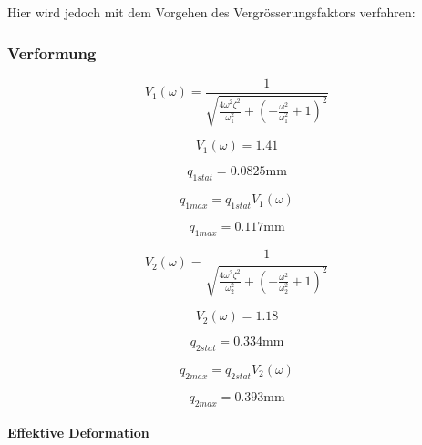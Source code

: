 \documentclass[
  letterpaper,
  DIV=11]{scrreprt}
\let\oldparagraph\paragraph
\renewcommand{\paragraph}[1]{\oldparagraph{#1}\mbox{}}
\begin{document}
Hier wird jedoch mit dem Vorgehen des Vergrösserungsfaktors verfahren:

\hypertarget{verformung}{%
\subsubsection{Verformung}\label{verformung}}

\begin{equation}V_{1}{\left(\omega \right)} = \frac{1}{\sqrt{\frac{4 \omega^{2} \zeta_{}^{2}}{\omega_{1}^{2}} + \left(- \frac{\omega^{2}}{\omega_{1}^{2}} + 1\right)^{2}}}\end{equation}

\begin{equation}V_{1}{\left(\omega \right)} = 1.41\end{equation}

\begin{equation}q_{1 stat} = 0.0825 \text{mm}\end{equation}

\begin{equation}q_{1 max} = q_{1 stat} V_{1}{\left(\omega \right)}\end{equation}

\begin{equation}q_{1 max} = 0.117 \text{mm}\end{equation}

\begin{equation}V_{2}{\left(\omega \right)} = \frac{1}{\sqrt{\frac{4 \omega^{2} \zeta_{}^{2}}{\omega_{2}^{2}} + \left(- \frac{\omega^{2}}{\omega_{2}^{2}} + 1\right)^{2}}}\end{equation}

\begin{equation}V_{2}{\left(\omega \right)} = 1.18\end{equation}

\begin{equation}q_{2 stat} = 0.334 \text{mm}\end{equation}

\begin{equation}q_{2 max} = q_{2 stat} V_{2}{\left(\omega \right)}\end{equation}

\begin{equation}q_{2 max} = 0.393 \text{mm}\end{equation}

\hypertarget{effektive-deformation}{%
\paragraph{Effektive Deformation}\label{effektive-deformation}}
\end{document}
